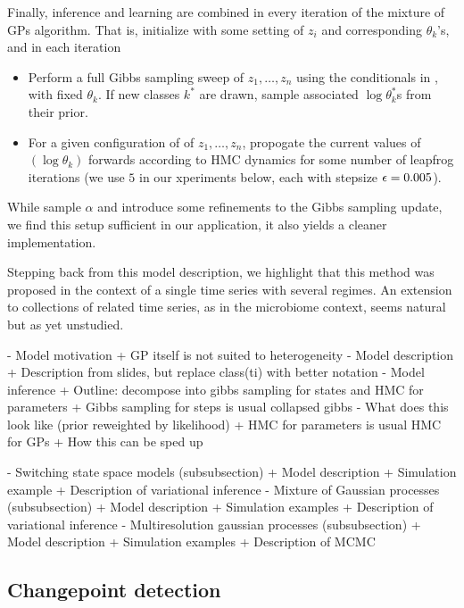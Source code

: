 \documentclass{article}
\begin{document}
Finally, inference and learning are combined in every iteration of the mixture
of GPs algorithm. That is, initialize with some setting of $z_i$ and
corresponding $\theta_k$'s, and in each iteration
\begin{itemize}
\item Perform a full Gibbs sampling sweep of $z_1, \dots, z_n$ using the
  conditionals in \label{eq:igp_conditional}, with fixed $\theta_k$. If new
  classes $k^\ast$ are drawn, sample associated $\log \theta_k^\ast$s from their
  prior.
\item For a given configuration of of $z_1, \dots, z_n$, propogate the current
  values of $\left(\log \theta_k\right)$ forwards according to HMC dynamics for
  some number of leapfrog iterations (we use $5$ in our xperiments below, each
  with stepsize $\epsilon = 0.005$).
\end{itemize}

While \citep{rasmussen2006} sample $\alpha$ and introduce some refinements to
the Gibbs sampling update, we find this setup sufficient in our application, it
also yields a cleaner implementation.

Stepping back from this model description, we highlight that this method was
proposed in the context of a single time series with several regimes. An
extension to collections of related time series, as in the microbiome context,
seems natural but as yet unstudied.

- Model motivation
    + GP itself is not suited to heterogeneity
- Model description
    + Description from slides, but replace class(ti) with better notation
- Model inference
    + Outline: decompose into gibbs sampling for states and HMC for parameters
    + Gibbs sampling for steps is usual collapsed gibbs
      - What does this look like (prior reweighted by likelihood)
    + HMC for parameters is usual HMC for GPs
    + How this can be sped up

- Switching state space models (subsubsection)
   + Model description
   + Simulation example
   + Description of variational inference
- Mixture of Gaussian processes (subsubsection)
  + Model description
  + Simulation examples
  + Description of variational inference
- Multiresolution gaussian processes (subsubsection)
  + Model description
  + Simulation examples
  + Description of MCMC

\subsection{Changepoint detection}
\end{document}
